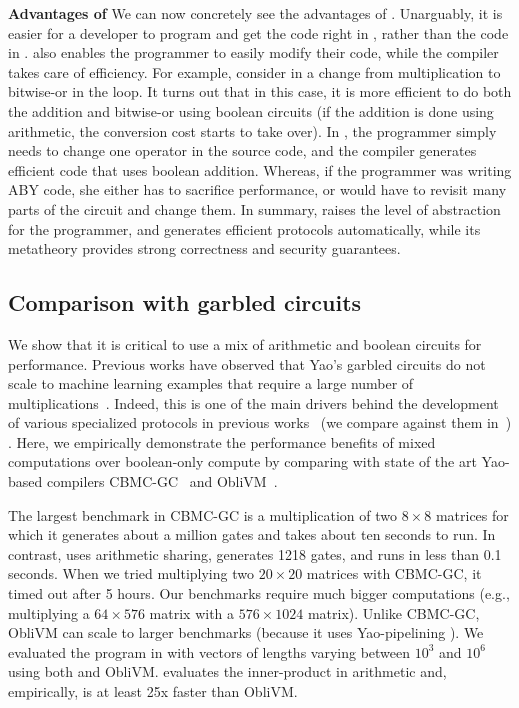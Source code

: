 \noindent\textbf{Advantages of \tool} We can now concretely see the advantages of \tool. Unarguably, it is
easier for a developer to program and get the code right in
, rather than the code in
.
\tool also enables the
programmer to easily modify their code, while the compiler takes care
of efficiency. For example, consider in  a
change from multiplication to bitwise-or in the  loop. It
turns out that in this case, it is more efficient to do both
the addition and bitwise-or using boolean circuits (if the addition is
done using arithmetic, the conversion cost starts to take
over). In \tool, the programmer simply needs to change one operator in
the source code, and the compiler generates efficient code that uses
boolean addition. Whereas, if the programmer was writing ABY
code, she either has to sacrifice performance, or would have to
revisit many parts of the circuit and change them. In summary, \tool raises the level of abstraction for the
programmer, and generates efficient \mpc protocols automatically,
while its metatheory provides strong correctness and security
guarantees. 

\subsection{Comparison with garbled circuits}
\label{sec:oblivm}
We show that it is critical to use a mix of arithmetic and boolean circuits  for performance.
 Previous works have observed that Yao's garbled circuits do not scale to machine learning examples that require a large number of multiplications~\cite{aby,tasty,autoS,secureml,minionn,chameleon}.
Indeed, this is one of the main drivers behind the development of various specialized \mpc protocols in previous works~\cite{secureml,minionn,shafindss} (we compare against them in~) .
Here, we empirically demonstrate the performance benefits of mixed computations over boolean-only compute by comparing with state of the art Yao-based compilers CBMC-GC~\cite{cbmcgc} and ObliVM~\cite{oblivm}.

The largest benchmark in CBMC-GC is a multiplication of two $8\times 8$ matrices for which it generates about a million gates and takes about ten seconds to run. In contrast, \tool uses arithmetic sharing, generates 1218 gates, and runs in less than 0.1 seconds. When we tried multiplying two $20\times 20$ matrices with CBMC-GC, it timed out after 5 hours. Our benchmarks require much bigger computations (e.g., multiplying a $64\times576$ matrix with a $576\times1024$ matrix). Unlike CBMC-GC, ObliVM can scale to larger benchmarks (because it uses Yao-pipelining \cite{yao-pipe}). We evaluated the program in  with vectors of lengths varying between $10^3$ and $10^6$ using both \tool and ObliVM. 
\tool evaluates the inner-product in arithmetic and, empirically, is at least 25x faster than ObliVM. 

